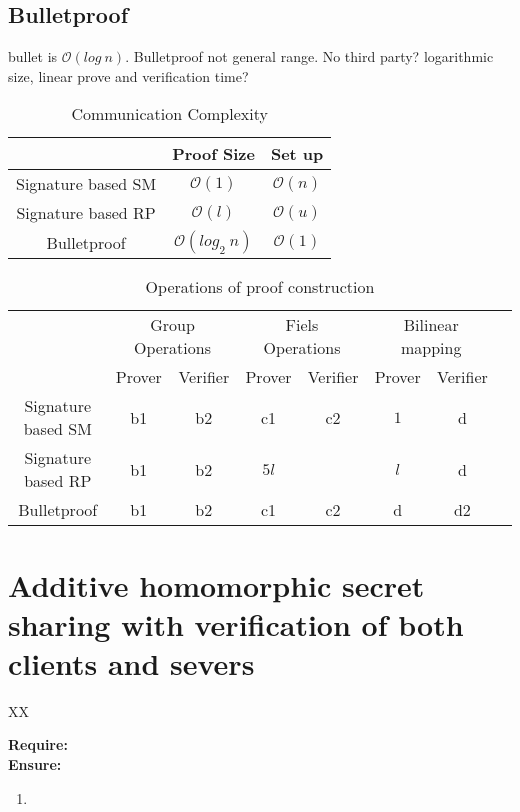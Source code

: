 \subsection{Bulletproof}
bullet is $\mathcal{O}(log\:n)$. Bulletproof not general range. No third party?
 logarithmic size, linear prove and verification time? 
 


\begin{table}[H]
\label{tab:compare}
\caption{Communication Complexity}
\begin{tabular}{| *{3}{c|}}
			 \hline
    									&Proof Size 		&		Set up  \\ \hline		
  Signature based SM  	&   $\mathcal{O} (1) $ 					 &			 $\mathcal{O} (n)$				\\ \hline 
  Signature based RP  	&   $\mathcal{O} (l )$   	&	$\mathcal{O} (u)$ 
  	\\ \hline
  Bulletproof   				&   $ \mathcal{O} (  log_2\: n ) $  & $\mathcal{O} (1)$ 	\\
  \hline			
\end{tabular}
 \end{table}
	

\begin{table}[H]
\label{tab:compare}
\caption{Operations of proof construction}
\begin{tabular}{| *{8}{c|}}
			 \hline
    										&   \multicolumn{2}{c|}{Group Operations} 	& \multicolumn{2}{c|}{Fiels Operations}    & \multicolumn{2}{c|}{Bilinear mapping }        	\\
&  Prover & Verifier & Prover & Verifier&	Prover & Verifier 						 	\\ \hline
  Signature based SM  			&   b1  &   b2  											&   c1  &   c2    & $1$							 &d						\\ \hline 
  Signature based RP  	&   b1  &   b2 							&   $5l$ &     	 & $l$	& d	 										\\ \hline
  Bulletproof   						& b1  &   b2 												&   c1 &   c2     & d					&d2								\\ \hline	
\end{tabular}
 \end{table}
	
	

\section{Additive homomorphic secret sharing with verification of both clients and severs }
\begin{algorithm}[H]
\caption{XX}
\textbf{Require:} \\
\textbf{Ensure:} 
\\\hrulefill
\begin{enumerate}
  \item 
\end{enumerate}
\label{alg: 2D esprit}
\end{algorithm}
